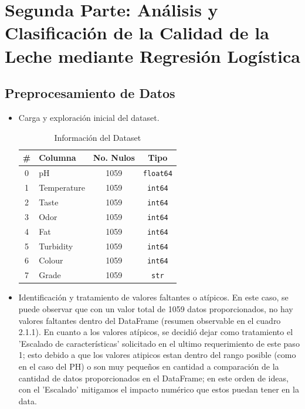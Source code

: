 \documentclass[12pt,a4paper]{article}
\begin{document}
\newpage
\section{Segunda Parte: Análisis y Clasificación de la Calidad de la Leche mediante Regresión Logística}
\subsection{Preprocesamiento de Datos}

\begin{itemize}
    \item[$\scalebox{0.7}{$\blacksquare$}$] Carga y exploración inicial del dataset.
		
		\begin{table}[h!]
		\centering
		\caption{Información del Dataset}
		\begin{tabular}{clcc}
		\hline
		\textbf{\#} & \textbf{Columna} & \textbf{No. Nulos} & \textbf{Tipo} \\
		\hline
		0 & pH          & 1059 & \texttt{float64} \\
		1 & Temperature & 1059 & \texttt{int64}   \\
		2 & Taste       & 1059 & \texttt{int64}   \\
		3 & Odor        & 1059 & \texttt{int64}   \\
		4 & Fat         & 1059 & \texttt{int64}   \\
		5 & Turbidity   & 1059 & \texttt{int64}   \\
		6 & Colour      & 1059 & \texttt{int64}   \\
		7 & Grade       & 1059 & \texttt{str}     \\
		\hline
		\end{tabular}
		\end{table}

    \item[$\scalebox{0.7}{$\blacksquare$}$] Identificación y tratamiento de valores faltantes o atípicos.
    En este caso, se puede observar que con un valor total de 1059 datos proporcionados, no hay valores faltantes dentro del DataFrame (resumen observable en el cuadro 2.1.1). En cuanto a los valores atípicos, se decidió dejar como tratamiento el 'Escalado de características' solicitado en el ultimo requerimiento de este paso 1; esto debido a que los valores atipicos estan dentro del rango posible (como en el caso del PH) o son muy pequeños en cantidad a comparación de la cantidad de datos proporcionados en el DataFrame; en este orden de ideas, con el 'Escalado' mitigamos el impacto numérico que estos puedan tener en la data.


\end{itemize}
\end{document}
